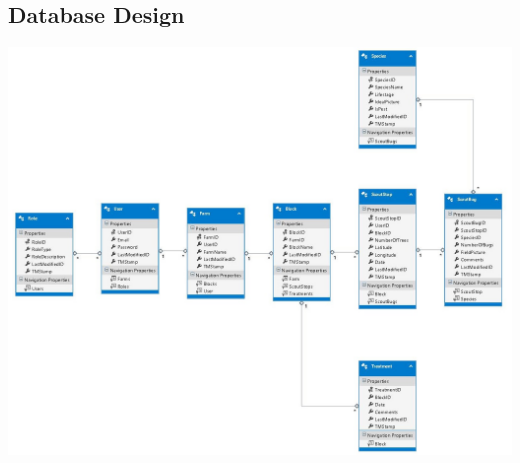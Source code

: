 \documentclass[11pt,a4paper,titlepage]{article}
\begin{document}
	\subsection{Database Design}
	\includegraphics[width=\linewidth]{ERD}	
\end{document}
